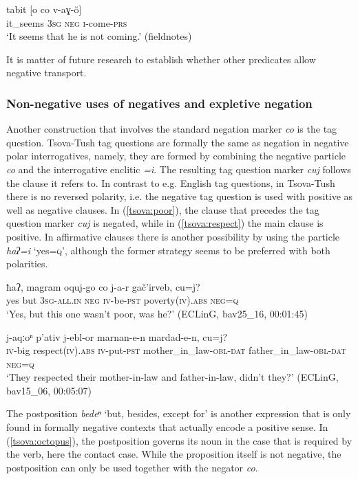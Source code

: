\documentclass[output=paper,%
colorlinks,citecolor=brown,
showindex
]{langscibook}
\begin{document}
\ea	\label{tsova:tabitnot}
\gll 	tabit [o co v-aɣ-ŏ]\\  
	it\_seems \textsc{3sg} \textsc{neg} \textsc{i}-come-\textsc{prs}\\
\glt `It seems that he is not coming.' (fieldnotes)
\z

It is matter of future research to establish whether other predicates allow negative transport.

\subsubsection{Non-negative uses of negatives and expletive negation}
\label{tsova:nonneguse}

Another  construction that involves the standard negation marker \textit{co} is the tag question. Tsova-Tush tag questions are formally the same as negation in negative polar interrogatives, namely, they are formed by combining the negative particle \textit{co} and the interrogative enclitic \textit{=i}. The resulting tag question marker \textit{cuj} follows the clause it refers to. In contrast to e.g. English tag questions, in Tsova-Tush there is no reversed polarity, i.e. the negative tag question is used with positive as well as negative clauses.  In (\ref{tsova:poor}), the clause that precedes the tag question marker \textit{cuj} is negated, while in (\ref{tsova:respect}) the main clause is positive. In affirmative clauses there is another possibility by using the particle \textit{haʔ=i} `yes=\textsc{q}', although the former strategy seems to be preferred with both polarities.

\ea	\label{tsova:poor}
\gll 	ħaʔ,	magram	oquj-go	co	j-a-r	gač’irveb,	cu=j?\\  
	yes but \textsc{3sg-all.in} \textsc{neg} \textsc{iv}-be-\textsc{pst} poverty\textsc{(iv).abs} \textsc{neg=q}\\
\glt `Yes, but this one wasn’t poor, was he?' (ECLinG, bav25\_16, 00:01:45)
\z

\ea	\label{tsova:respect}
\gll 	j-aqːoⁿ	p’ativ	j-ebl-or	marnan-e-n	mardad-e-n,	cu=j?\\  
	\textsc{iv}-big respect\textsc{(iv).abs} \textsc{iv}-put-\textsc{pst} mother\_in\_law-\textsc{obl-dat} father\_in\_law-\textsc{obl-dat} \textsc{neg=q}\\
\glt `They respected their mother-in-law and father-in-law, didn’t they?' (ECLinG, bav15\_06, 00:05:07)
\z

The postposition \textit{bedeⁿ} `but, besides, except for'  is another expression that is only found in formally negative contexts that actually encode a positive sense. In (\ref{tsova:octopus}), the postposition governs its noun in the case that is required by the verb, here the contact case. While the proposition itself is not negative, the postposition can only be used together with the negator \textit{co}.
\end{document}

